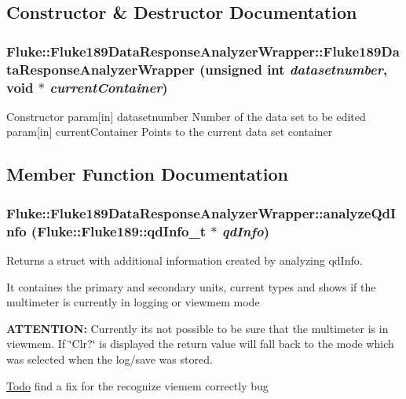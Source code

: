 \subsection{Constructor \& Destructor Documentation}
\hypertarget{classFluke_1_1Fluke189DataResponseAnalyzerWrapper_af4f891231353edf2c9a20743d3018b1e}{
\subsubsection[{Fluke189DataResponseAnalyzerWrapper}]{\setlength{\rightskip}{0pt plus 5cm}Fluke::Fluke189DataResponseAnalyzerWrapper::Fluke189DataResponseAnalyzerWrapper (unsigned int {\em datasetnumber}, \/  void $\ast$ {\em currentContainer})}}
\label{classFluke_1_1Fluke189DataResponseAnalyzerWrapper_af4f891231353edf2c9a20743d3018b1e}
Constructor param\mbox{[}in\mbox{]} datasetnumber Number of the data set to be edited param\mbox{[}in\mbox{]} currentContainer Points to the current data set container 

\subsection{Member Function Documentation}
\hypertarget{classFluke_1_1Fluke189DataResponseAnalyzerWrapper_a2bec1dad601bc993375d358ef77c7e6b}{
\subsubsection[{analyzeQdInfo}]{ Fluke::Fluke189DataResponseAnalyzerWrapper::analyzeQdInfo ({\bf Fluke::Fluke189::qdInfo\_\-t} $\ast$ {\em qdInfo})}}
\label{classFluke_1_1Fluke189DataResponseAnalyzerWrapper_a2bec1dad601bc993375d358ef77c7e6b}
Returns a struct with additional information created by analyzing qdInfo.\par
 It containes the primary and secondary units, current types and shows if the multimeter is currently in logging or viewmem mode\par
 {\bfseries ATTENTION:} Currently its not possible to be sure that the multimeter is in viewmem. If \char`\"{}Clr?\char`\"{} is displayed the return value will fall back to the mode which was selected when the log/save was stored. \begin{Desc}
\item[\hyperlink{todo__todo000021}{Todo}]find a fix for the recognize viemem correctly bug \end{Desc}

